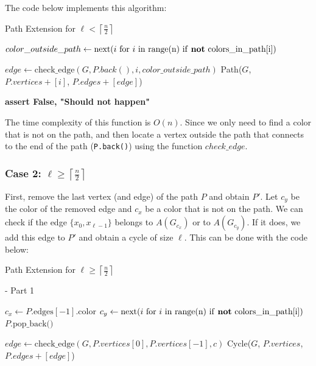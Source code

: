 The code below implements this algorithm:

\begin{algorithm}[H]
    \caption{Path Extension for \( \ell < \left \lceil \frac{n}{2} \right \rceil \)}
    \begin{algorithmic}[1]
         
        \State $color\_outside\_path \gets \text{next}(i \text{ for } i \text{ in range(n) if \textbf{not} colors\_in\_path[i]})$

                \State $edge \gets \text{check\_edge}(G, P.back(), i, color\_outside\_path)$
                    \State \Return Path($G$, $P.vertices + [i]$, $P.edges + [edge]$)
                \EndIf
            \EndIf
        \EndFor

        \State \textbf{assert False, "Should not happen"}
    \EndFunction
    \end{algorithmic}
\end{algorithm}

The time complexity of this function is \( O(n) \). Since we 
only need to find a color that is not on the path, and then locate a vertex outside 
the path that connects to the end of the path (\texttt{P.back()}) using the 
function $check\_edge$.

\subsubsection{Case 2: \( \ell \geq \left \lceil \frac{n}{2} \right \rceil \)}

First, remove the last vertex (and edge) of the path $P$ and obtain $P'$. 
Let $c_y$ be the color of the removed edge and $c_x$ be a color that is not on the path.
We can check if the edge $\{x_0, x_{\ell-1}\}$ belongs to $A(G_{c_x})$ or
to $A(G_{c_y})$. If it does, we add this edge to $P'$ and obtain a cycle of size $\ell$.
This can be done with the code below:

\begin{algorithm}[H]
    \caption{Path Extension for \( \ell \geq \left \lceil \frac{n}{2} \right \rceil \)} - Part 1
    \begin{algorithmic}
            \State $c_x \gets P.\text{edges}[-1].\text{color}$ 
            \State $c_y \gets \text{next}(i \text{ for } i \text{ in range(n) if \textbf{not} colors\_in\_path[i]})$
            \State $P.\text{pop\_back()}$ 

                \State $edge \gets \text{check\_edge}(G, P.vertices[0], P.vertices[-1], c)$
                    \State \Return Cycle($G$, $P.vertices$, $P.edges + [edge]$) 
                \EndIf
            \EndFor
        \EndFunction
    \end{algorithmic}
\end{algorithm}

